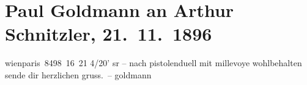 

         
         \renewcommand{\erwaehntePersonen}{Personen: Paul Goldmann, Lucien Millevoye}
         \renewcommand{\erwaehnteOrte}{Orte: Paris, Wien}
         \renewcommand{\erwaehnteWerke}{}
               \section[Paul Goldmann an Arthur Schnitzler, 21. 11. 1896]{ Paul Goldmann an Arthur Schnitzler, 21. 11. 1896}\nopagebreak{}\rehead{ }\begin{ledgroupsized}[t]{13cm}\normalsize\beginnumbering \toendnotes[C]{\smallbreak\pagebreak[2]} 
\pstart
           \centering{}{\pb}wienparis 8498 16 21{ }4/20’ sr –\pend
           \pstart
           nach pistolenduell mit millevoye
               wohlbehalten\pend
           \pstart sende dir herzlichen gruss. – \spacefill\mbox{goldmann}\pend{}
         
         \endnumbering{}\end{ledgroupsized}  \newcommand{\dateiname}{L02689}\newcommand{\titel}{Paul Goldmann an Arthur Schnitzler, 21. 11. 1896}\newcommand{\editorInnen}{Martin Anton Müller und Laura Untner}
      